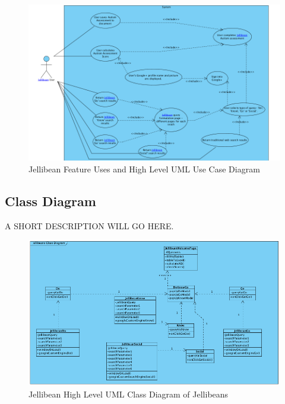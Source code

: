 \documentclass[a4paper, 11pt]{article}
\begin{document}
\begin{figure}[H]
\begin{center}
\includegraphics[scale=0.55]{JBeanUseCase}
\caption{Jellibean Feature Uses and High Level UML Use Case Diagram}
\label{JBeanUseCase1}
\end{center}
\end{figure}

\subsection{Class Diagram}

A SHORT DESCRIPTION WILL GO HERE.


\begin{figure}[H]
\begin{center}
\includegraphics[scale=0.55]{jBeanClassDiagram}
\caption{Jellibean High Level UML Class Diagram of Jellibeans}
\label{jBeanClassDiagram1}
\end{center}
\end{figure}
\end{document}
